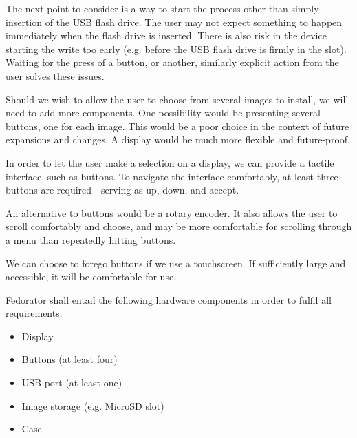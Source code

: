         The next point to consider is a way to start the process other than simply insertion of the USB flash drive.  The user may not expect something to happen immediately when the flash drive is inserted.  There is also risk in the device starting the write too early (e.g. before the USB flash drive is firmly in the slot).  Waiting for the press of a button, or another, similarly explicit action from the user solves these issues.
        
        Should we wish to allow the user to choose from several images to install, we will need to add more components.  One possibility would be presenting several buttons, one for each image.  This would be a poor choice in the context of future expansions and changes.  A display would be much more flexible and future-proof.
        
        In order to let the user make a selection on a display, we can provide a tactile interface, such as buttons.  To navigate the interface comfortably, at least three buttons are required - serving as up, down, and accept.
        
        An alternative to buttons would be a rotary encoder.  It also allows the user to scroll comfortably and choose, and may be more comfortable for scrolling through a menu than repeatedly hitting buttons.
        
        We can choose to forego buttons if we use a touchscreen.  If sufficiently large and accessible, it will be comfortable for use.
        
        
        
        Fedorator shall entail the following hardware components in order to fulfil all requirements.
        \begin{itemize}
            \item Display
            \item Buttons (at least four)
            \item USB port (at least one)
            \item Image storage (e.g. MicroSD slot)
            \item Case
        \end{itemize}
        
        \blind[1]
